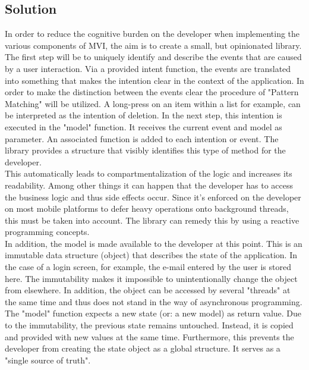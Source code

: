 \subsection{Solution}
\label{subsec:solution}

In order to reduce the cognitive burden on the developer when implementing the various components of MVI, the aim 
is to create a small, but opinionated library.
\\
The first step will be to uniquely identify and describe the events that are caused by a user interaction.
Via a provided intent function, the events are translated into something that makes the intention clear in the context of the application.
In order to make the distinction between the events clear the procedure of "Pattern Matching" 
\cite{wikiPatterMatching,scalaDocsPatterMatching}
will be utilized. A long-press on an item within a list for example, can be interpreted as the intention of deletion. In the next step, this intention is executed in 
the "model" function. It receives the current event and model as parameter. An associated function is added to each intention or event. The library provides a structure 
that visibly identifies this type of method for the developer.
\\
This automatically leads to compartmentalization of the logic and increases its readability. Among other things it can happen that the developer has to access the business 
logic
\cite{wikic2BusinessLogic} 
and thus side effects 
\cite{sideEffectsFunctionalLightJavaScript,sideEffectsCompilerDetection}
occur. Since it's enforced on the developer on most mobile platforms to defer heavy operations onto background threads, this must be taken
into account. The library can remedy this by using a reactive programming concepts.
\\
In addition, the model is made available to the developer
at this point. This is an immutable data structure (object) that describes the state of the application. In the case of a login screen, for example, the e-mail 
entered by the user is stored here. The immutability makes it impossible to unintentionally change the object from elsewhere. In addition, the object can be accessed 
by several "threads" at the same time and thus does not stand in the way of asynchronous programming. The "model" function expects a new state (or: a new model) 
as return value. Due to the immutability, the previous state remains untouched. Instead, it is copied and provided with new values at the same time. Furthermore, 
this prevents the developer from creating the state object as a global structure. It serves as a "single source of truth".
